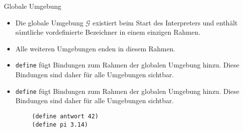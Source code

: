 \begin{frame}[t,fragile]{Globale Umgebung}
	\begin{itemize}
		\item Die globale Umgebung $\mathcal{G}$ existiert beim Start des Interpreters und enthält sämtliche vordefinierte Bezeichner in einem einzigen Rahmen.
		\item Alle weiteren Umgebungen enden in diesem Rahmen.
		
		\vspace*{0.25cm}
		
		\begin{center}
		\end{center}
		\item \texttt{define} fügt Bindungen zum Rahmen der globalen Umgebung hinzu.
			Diese Bindungen sind daher für alle Umgebungen sichtbar.
	\end{itemize}
\end{frame}

\begin{frame}[t,fragile]{}
	\begin{itemize}
		\item \texttt{define} fügt Bindungen zum Rahmen der globalen Umgebung hinzu.
			Diese Bindungen sind daher für alle Umgebungen sichtbar.
	\end{itemize}
	\begin{verbatim}
		(define antwort 42)
		(define pi 3.14)
	\end{verbatim}
	
	\begin{center}
	\end{center}
\end{frame}

